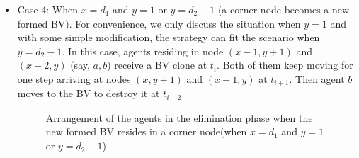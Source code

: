 \begin{itemize}
\item Case 4: When $x=d_1$ and $y=1$ or $y=d_2-1$ (a corner node becomes a new formed BV). For convenience, we only discuss the situation when $y=1$ and with some simple modification, the strategy can fit the scenario when $y=d_2-1$.  In this case, agents residing in node $(x-1, y+1)$ and $(x-2, y)$ (say, $a,b$) receive a BV clone at $t_i$. Both of them keep moving for one step arriving  at nodes $(x, y+1)$ and $(x-1, y)$ at $t_{i+1}$. Then agent $b$ moves to the BV to destroy it at $t_{i+2}$
\begin{figure} [H]
  \centering 
 \hspace{1in} 
    \caption{Arrangement of the agents in the elimination phase when the new formed BV resides in a corner node(when $x=d_1$ and $y=1$ or $y=d_2-1$)} 
  \label{fig:casefour} %
\end{figure}
\end{itemize}

